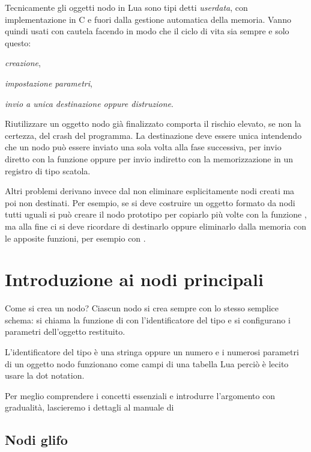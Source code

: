 Tecnicamente gli oggetti nodo in Lua sono tipi detti \emph{userdata}, con
implementazione in C e fuori dalla gestione automatica della memoria. Vanno
quindi usati con cautela facendo in modo che il ciclo di vita sia sempre e solo
questo:
\begin{compactenumerate}
\item \emph{creazione}, 
\item \emph{impostazione parametri},
\item \emph{invio a unica destinazione oppure distruzione}.
\end{compactenumerate}

Riutilizzare un oggetto nodo già finalizzato comporta il rischio elevato, se non
la certezza, del crash del programma. La destinazione deve essere unica
intendendo che un nodo può essere inviato una sola volta alla fase successiva,
per invio diretto con la funzione  oppure per
invio indiretto con la memorizzazione in un registro di tipo scatola.

Altri problemi derivano invece dal non eliminare esplicitamente nodi creati ma
poi non destinati. Per esempio, se si deve costruire un oggetto formato da nodi
tutti uguali si può creare il nodo prototipo per copiarlo più volte con la
funzione , ma alla fine ci si deve ricordare di
destinarlo oppure eliminarlo dalla memoria con le apposite funzioni, per esempio
con .


\section{Introduzione ai nodi principali}

Come si crea un nodo? Ciascun nodo si crea sempre con lo stesso semplice schema:
si chiama la funzione  di  con
l'identificatore del tipo e si configurano i parametri dell'oggetto restituito.

L'identificatore del tipo è una stringa oppure un numero e i numerosi parametri
di un oggetto nodo funzionano come campi di una tabella Lua perciò è lecito
usare la dot notation.

Per meglio comprendere i concetti essenziali e introdurre l'argomento con
gradualità, lascieremo i dettagli al manuale di \LuaTeX{} \cite{prg:luatex} 


\subsection{Nodi glifo}

